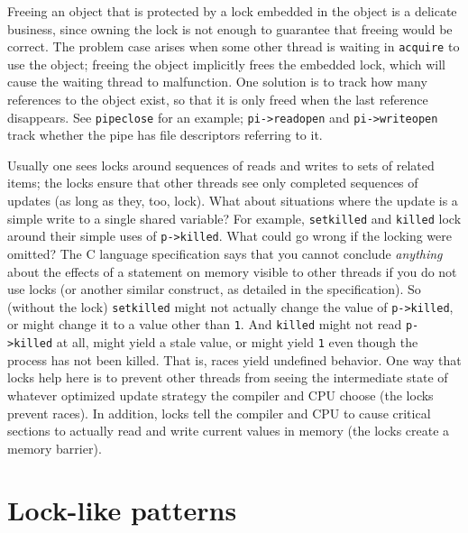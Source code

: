 Freeing an object that is protected by a lock embedded in the object
is a delicate business, since owning the lock is
not enough to guarantee that freeing would be correct. The problem
case arises when some other thread is waiting in {\tt acquire} to use
the object; freeing the object implicitly frees the embedded lock, which will
cause the waiting thread to malfunction. One solution is to track how
many references to the object exist, so that it is only freed when the
last reference disappears. See {\tt pipeclose}
 for an example;
{\tt pi->readopen} and {\tt pi->writeopen} track whether
the pipe has file descriptors referring to it.

Usually one sees locks around sequences of reads and writes to sets of related
items; the locks ensure that other threads see only completed sequences of
updates (as long as they, too, lock).
What about situations where the update is a simple write to a
single shared variable? For example, 
\texttt{setkilled} and \texttt{killed}
lock around their simple uses of
\lstinline{p->killed}.
What could go wrong if the locking were omitted?
The C language specification says that you
cannot conclude \textit{anything} about the effects of a
statement on memory visible to other threads if you do
not use locks (or another similar construct, as detailed in
the specification). So (without the lock) \texttt{setkilled} might
not actually change the value of \lstinline{p->killed}, or
might change it to a value other than \texttt{1}. And \texttt{killed}
might not read \lstinline{p->killed} at all, might yield a stale
value, or might yield \texttt{1} even though the process has not been killed.
That is, races yield undefined behavior.
One way that locks help here is to
prevent other threads from seeing the intermediate state of whatever
optimized update strategy the compiler and CPU
choose (the locks prevent races).
In addition,
locks tell the compiler and CPU to 
cause critical sections to actually read and write current
values in memory (the locks create a memory barrier).


\section{Lock-like patterns}

